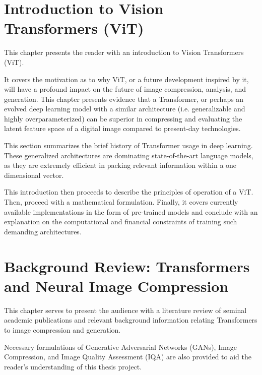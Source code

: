 \documentclass[pdftex,11pt,titlepage,twoside,openright]{report}
\begin{document}
\setcounter{page}{1}



\chapter{Introduction to Vision Transformers (ViT)}


This chapter presents the reader with an introduction to Vision Transformers (ViT).

It covers the motivation as to why ViT, or a future development inspired by it,
will have a profound impact on the future of image compression, analysis, and generation.
This chapter presents evidence that a Transformer, or perhaps an evolved deep learning model with a
similar architecture (i.e. generalizable and highly overparameterized) can be superior in
compressing and evaluating the latent feature space of a digital image compared to present-day
technologies.

This section summarizes the brief history of Transformer usage in deep learning.
These generalized architectures are dominating state-of-the-art language models,
as they are extremely efficient in packing relevant information within a one dimensional vector.

This introduction then proceeds to describe the principles of operation of a ViT. 
Then, proceed with a mathematical formulation. Finally, it covers currently 
available implementations in the form of pre-trained models and conclude with an 
explanation on the computational and financial constraints of training such demanding 
architectures.

\ThinHRule

\newpage



\chapter{Background Review: Transformers and Neural Image Compression}


This chapter serves to present the audience with a literature review of seminal academic
publications and relevant background information relating Transformers to image 
compression and generation.

Necessary formulations of Generative Adversarial Networks (GANs),
Image Compression, and Image Quality Assessment (IQA)
are also provided to aid the reader's understanding of this thesis project.
\end{document}
